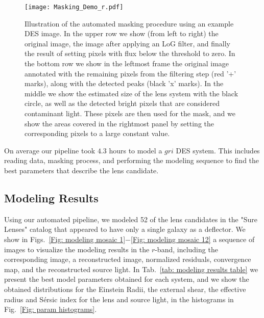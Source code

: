 \documentclass[tradiabstract,twocolumn]{aa}
\begin{document}
\begin{figure}
\centering
\texttt{[image: Masking\_Demo\_r.pdf]}
\caption{Illustration of the automated masking procedure using an example DES image. In the upper row we show (from left to right) the original image, the image after applying an LoG filter, and finally the result of setting pixels with flux below the threshold to zero. In the bottom row we show in the leftmost frame the original image annotated with the remaining pixels from the filtering step (red '+' marks), along with the detected peaks (black 'x' marks). In the middle we show the estimated size of the lens system with the black circle, as well as the detected bright pixels that are considered contaminant light. These pixels are then used for the mask, and we show the areas covered in the rightmost panel by setting the corresponding pixels to a large constant value.}
\label{Fig: Masking}
\end{figure}

On average our pipeline took $4.3$ hours to model a $gri$ DES system. This includes reading data, masking process, and performing the modeling sequence to find the best parameters that describe the lens candidate.


\subsection{Modeling Results}

Using our automated pipeline, we modeled 52 of the lens candidates in the "Sure Lenses" catalog that appeared to have only a single galaxy as a deflector. We show in Figs.~\ref{Fig: modeling mosaic 1}$-$\ref{Fig: modeling mosaic 12} a sequence of images to visualize the modeling results in the $r$-band, including the corresponding image, a reconstructed image, normalized residuals, convergence map, and the reconstructed source light. In Tab.~\ref{tab: modeling results table} we present the best model parameters obtained for each system, and we show the obtained distributions for the Einstein Radii, the external shear, the effective radius and S\'ersic index for the lens and source light, in the histograms in Fig.~\ref{Fig: param histograms}. 
\end{document}
